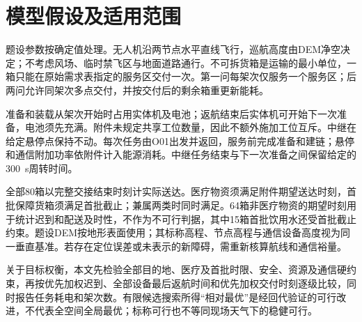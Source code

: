 \section{模型假设及适用范围}

题设参数按确定值处理。无人机沿两节点水平直线飞行，巡航高度由DEM净空决定；不考虑风场、临时禁飞区与地面道路通行。不可拆货箱是运输的最小单位，一箱只能在原始需求表指定的服务区交付一次。第一问每架次仅服务一个服务区；后两问允许同架次多点交付，并按交付后的剩余箱重更新能耗。

准备和装载从架次开始时占用实体机及电池；返航结束后实体机可开始下一次准备，电池须先充满。附件未规定共享工位数量，因此不额外施加工位互斥。中继在给定悬停点保持不动。每次任务由O01出发并返回，服务前完成准备和建链；悬停和通信附加功率依附件计入能源消耗。中继任务结束与下一次准备之间保留给定的300~s周转时间。

全部80箱以完整交接结束时刻计实际送达。医疗物资须满足附件期望送达时刻，首批保障货箱须满足首批截止；兼属两类时同时满足。64箱非医疗物资的期望时刻用于统计迟到和配送及时性，不作为不可行判据，其中15箱首批饮用水还受首批截止约束。题设DEM按地形表面使用；其标称高程、节点高程与通信设备高度视为同一垂直基准。若存在定位误差或未表示的新障碍，需重新核算航线和通信裕量。

关于目标权衡，本文先检验全部目的地、医疗及首批时限、安全、资源及通信硬约束，再按优先加权迟到、全部设备最后返航时间和优先加权交付时刻逐级比较，同时报告任务耗电和架次数。有限候选搜索所得“相对最优”是经回代验证的可行改进，不代表全空间全局最优；标称可行也不等同现场天气下的稳健可行。
